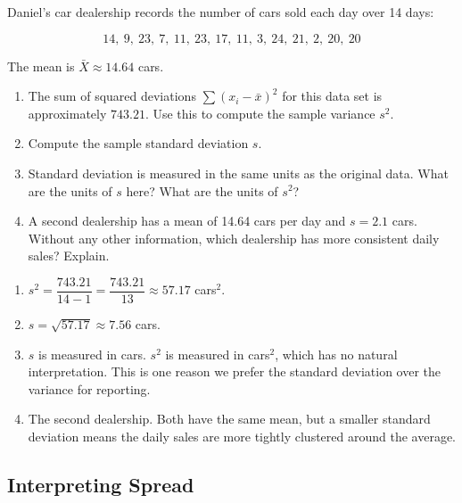 \begin{Exercise}[title={Computing Variance and Standard Deviation},
label={ex:variance_sd}]
Daniel's car dealership records the number of cars sold each day over
14 days:

\[ 14,\ 9,\ 23,\ 7,\ 11,\ 23,\ 17,\ 11,\ 3,\ 24,\ 21,\ 2,\ 20,\ 20 \]

The mean is $\bar{X} \approx 14.64$ cars.

\begin{enumerate} 
    \item The sum of squared deviations $\displaystyle\sum(x_i -
    \bar{x})^2$ for this data set is approximately $743.21$. Use this
    to compute the sample variance $s^2$.
    \item Compute the sample standard deviation $s$.
    \item Standard deviation is measured in the same units as the
    original data. What are the units of $s$ here? What are the units
    of $s^2$?
    \item A second dealership has a mean of 14.64 cars per day and
    $s = 2.1$ cars. Without any other information, which dealership
    has more consistent daily sales? Explain.
\end{enumerate}
\end{Exercise}

\begin{Answer}[ref={ex:variance_sd}]
\begin{enumerate} 
    \item $s^2 = \dfrac{743.21}{14 - 1} = \dfrac{743.21}{13}
    \approx 57.17$ cars$^2$.

    \item $s = \sqrt{57.17} \approx 7.56$ cars.
    \item $s$ is measured in cars. $s^2$ is measured in cars$^2$,
    which has no natural interpretation. This is one reason we prefer the
    standard deviation over the variance for reporting.
    \item The second dealership. Both have the same mean, but a smaller
    standard deviation means the daily sales are more tightly clustered
    around the average.
\end{enumerate}
\end{Answer}

\subsection{Interpreting Spread}


